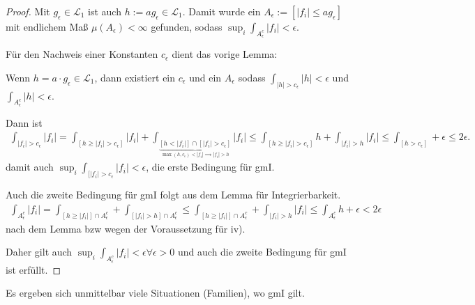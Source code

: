 \documentclass[]{article}
\begin{document}
\begin{proof}
	Mit $g_\epsilon \in \mathcal{L}_1$ ist auch $h:=ag_\epsilon \in \mathcal{L}_1$. Damit wurde ein $A_\epsilon := [|f_i| \leq a g_\epsilon]$ mit endlichem Maß $\mu(A_\epsilon) <\infty$ gefunden, sodass $\sup_i \int_{A_\epsilon^c} |f_i| < \epsilon$.
	
	Für den Nachweis einer Konstanten $c_\epsilon$ dient das vorige Lemma:
	
	Wenn $h=a\cdot g_\epsilon \in \mathcal{L}_1$, dann existiert ein $c_\epsilon$ und ein $A_\epsilon$ sodass $\int_{|h|>c_\epsilon}|h|<\epsilon$ und $\int_{A_\epsilon^c}|h|<\epsilon$.
	
	Dann ist
	\begin{align*}
		\int_{|f_i| > c_\epsilon}|f_i| = \int_{[h\geq |f_i|>c_\epsilon]} |f_i| + \int_{\underbrace{[h<|f_i|]\cap[|f_i|>c_\epsilon]}_{\max(h,c_\epsilon)<|f_i| \implies |f_i|>h}} |f_i| \leq \int_{[h\geq |f_i|>c_\epsilon]} h + \int_{|f_i| > h} |f_i| \leq \int_{[h>c_\epsilon]} + \epsilon \leq 2\epsilon.
	\end{align*}
	damit auch $\sup_i \int_{[|f_i|>c_\epsilon}|f_i| < \epsilon$, die erste Bedingung für gmI.
	
	Auch die zweite Bedingung für gmI folgt aus dem Lemma für Integrierbarkeit.
	\begin{align*}
		\int_{A^c_\epsilon}|f_i| = \int_{[h\geq |f_i|]\cap A^c_\epsilon} + \int_{[|f_i|>h]\cap A^c_\epsilon} \leq \int_{[h\geq |f_i|]\cap A^c_\epsilon} +\int_{|f_i|>h} |f_i| \leq \int_{A^c_\epsilon} h + \epsilon < 2\epsilon
	\end{align*}
	nach dem Lemma bzw wegen der Voraussetzung für iv).
	
	Daher gilt auch $\sup_i \int_{A^c_\epsilon}|f_i| < \epsilon \forall \epsilon > 0$ und auch die zweite Bedingung für gmI ist erfüllt.
\end{proof}
Es ergeben sich unmittelbar viele Situationen (Familien), wo gmI gilt.
\end{document}
